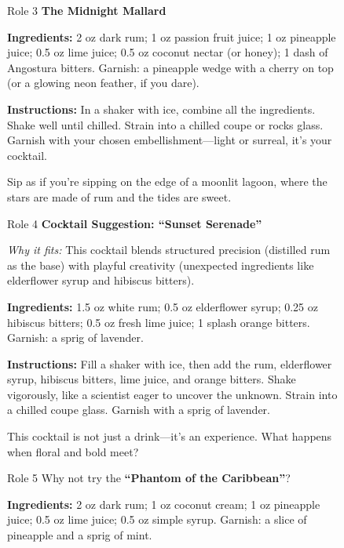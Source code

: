\begin{figure}[t]
\begin{minipage}[t]{0.32\linewidth}
\begin{modarespbox}{Role 3}
\textbf{The Midnight Mallard}

\textbf{Ingredients:} 2 oz dark rum; 1 oz passion fruit juice; 1 oz pineapple juice; 0.5 oz lime juice; 0.5 oz coconut nectar (or honey); 1 dash of Angostura bitters. Garnish: a pineapple wedge with a cherry on top (or a glowing neon feather, if you dare).

\textbf{Instructions:} In a shaker with ice, combine all the ingredients. Shake well until chilled. Strain into a chilled coupe or rocks glass. Garnish with your chosen embellishment---light or surreal, it's your cocktail.

Sip as if you're sipping on the edge of a moonlit lagoon, where the stars are made of rum and the tides are sweet.
\end{modarespbox}
\end{minipage}

\vspace{6pt}

\begin{minipage}[t]{0.32\linewidth}
\begin{modarespbox}{Role 4}
\textbf{Cocktail Suggestion: ``Sunset Serenade''}

\textit{Why it fits:} This cocktail blends structured precision (distilled rum as the base) with playful creativity (unexpected ingredients like elderflower syrup and hibiscus bitters).

\textbf{Ingredients:} 1.5 oz white rum; 0.5 oz elderflower syrup; 0.25 oz hibiscus bitters; 0.5 oz fresh lime juice; 1 splash orange bitters. Garnish: a sprig of lavender.

\textbf{Instructions:} Fill a shaker with ice, then add the rum, elderflower syrup, hibiscus bitters, lime juice, and orange bitters. Shake vigorously, like a scientist eager to uncover the unknown. Strain into a chilled coupe glass. Garnish with a sprig of lavender.

This cocktail is not just a drink---it's an experience. What happens when floral and bold meet?
\end{modarespbox}
\end{minipage}\hfill%
\begin{minipage}[t]{0.32\linewidth}
\begin{modarespbox}{Role 5}
Why not try the \textbf{``Phantom of the Caribbean''}?

\textbf{Ingredients:} 2 oz dark rum; 1 oz coconut cream; 1 oz pineapple juice; 0.5 oz lime juice; 0.5 oz simple syrup. Garnish: a slice of pineapple and a sprig of mint.


\end{modarespbox}
\end{minipage}
\end{figure}
